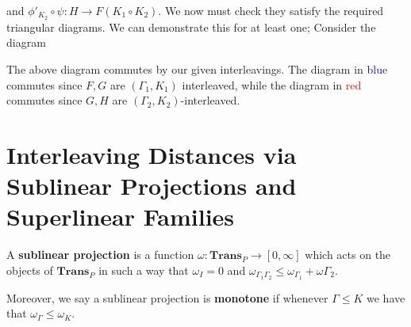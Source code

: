 \begin{prf}
    and $\phi'_{K_2}\circ \psi: H \to F(K_1\circ K_2)$. We now must check they satisfy the required triangular diagrams. 
    We can demonstrate this for at least one; Consider the diagram 
    \begin{center}
    \end{center}
    The above diagram commutes by our given interleavings. The diagram 
    in \textcolor{Blue}{blue} commutes since $F, G$ are $(\Gamma_1, K_1)$ interleaved, 
    while the diagram in \textcolor{Red}{red} commutes since $G, H$ 
    are $(\Gamma_2, K_2)$-interleaved. 


\end{prf}

\newpage 
\section{Interleaving Distances via Sublinear Projections and Superlinear Families}
\begin{definition}
    A \textbf{sublinear projection} is a function $\omega: \textbf{Trans}_P \to [0, \infty]$
    which acts on the objects of $\textbf{Trans}_P$ in such a way that 
    $\omega_I = 0$ and $\omega_{\Gamma_1\Gamma_2} \le \omega_{\Gamma_1} + \omega{\Gamma_2}$. 

    Moreover, we say a sublinear projection is \textbf{monotone} if whenever 
    $\Gamma \le K$ we have that $\omega_{\Gamma} \le \omega_{K}$. 
\end{definition}

